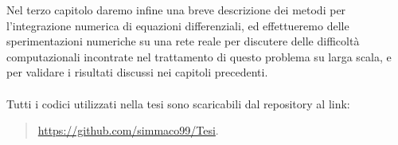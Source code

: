 \documentclass[12pt,a4paper,twoside]{report}
\begin{document}
Nel terzo capitolo daremo infine una breve descrizione dei metodi per l'integrazione numerica di equazioni differenziali, ed effettueremo delle sperimentazioni numeriche su una rete reale per discutere delle difficolt\`a computazionali incontrate nel trattamento di questo problema su larga scala, e per validare i risultati discussi nei capitoli precedenti.\\ \\
Tutti i codici utilizzati nella tesi sono scaricabili dal  repository al link:
\begin{quote}
\url{https://github.com/simmaco99/Tesi}.
\end{quote}














\cleardoublepage
\listoffigures
{}
\listoftables
{}
\cleardoublepage
\tableofcontents
\end{document}
